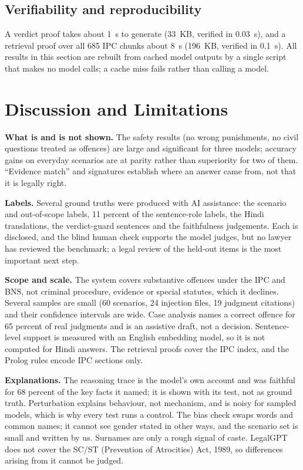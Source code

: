 \documentclass[conference]{IEEEtran}
\begin{document}
\subsection{Verifiability and reproducibility}

A verdict proof takes about 1~s to generate (33~KB, verified in 0.03~s), and a retrieval proof over
all 685 IPC chunks about 8~s (196~KB, verified in 0.1~s). All results in this section are rebuilt from cached model
outputs by a single script that makes no model calls; a cache miss fails rather than calling a
model.

\section{Discussion and Limitations}

\textbf{What is and is not shown.} The safety results (no wrong punishments, no civil questions
treated as offences) are large and significant for three models; accuracy gains on everyday scenarios
are at parity rather than superiority for two of them. ``Evidence match'' and signatures establish
where an answer came from, not that it is legally right.

\textbf{Labels.} Several ground truths were produced with AI assistance: the scenario and
out-of-scope labels, 11 percent of the sentence-role labels, the Hindi translations, the verdict-guard
sentences and the faithfulness judgements. Each is disclosed, and the blind human check supports the
model judges, but no lawyer has reviewed the benchmark; a legal review of the held-out items is the
most important next step.

\textbf{Scope and scale.} The system covers substantive offences under the IPC and BNS, not criminal
procedure, evidence or special statutes, which it declines. Several samples are small (60 scenarios,
24 injection files, 19 judgment citations) and their confidence intervals are wide. Case analysis
names a correct offence for 65 percent of real judgments and is an assistive draft, not a decision.
Sentence-level support is measured with an English embedding model, so it is not computed for Hindi
answers. The retrieval proofs cover the IPC index, and the Prolog rules encode IPC sections only.

\textbf{Explanations.} The reasoning trace is the model's own account and was faithful for 68 percent
of the key facts it named; it is shown with its test, not as ground truth. Perturbation explains
behaviour, not mechanism, and is noisy for sampled models, which is why every test runs a control.
The bias check swaps words and common names; it cannot see gender stated in other ways, and the
scenario set is small and written by us. Surnames are only a rough signal of caste. LegalGPT does not
cover the SC/ST (Prevention of Atrocities) Act, 1989, so differences arising from it cannot be judged.
\end{document}

